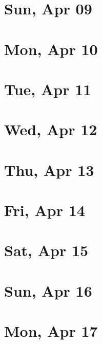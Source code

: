 	\section{Sun, Apr 09}
		
		
	\section{Mon, Apr 10}
		
		
	\section{Tue, Apr 11}
		
		
	\section{Wed, Apr 12}
		
		
	\section{Thu, Apr 13}
		
		
	\section{Fri, Apr 14}
		
		
	\section{Sat, Apr 15}
		
		
	\section{Sun, Apr 16}
		
		
	\section{Mon, Apr 17}
		
		
